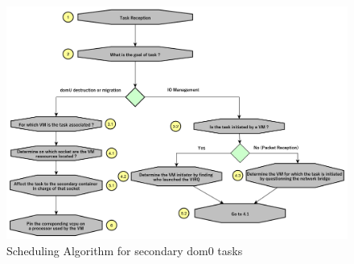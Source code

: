 \begin{figure}[!h]
    \centering
    \includegraphics[scale=0.35]{fig04/algoSecondGroupSchedulingDom0.pdf}
    \caption{Scheduling Algorithm for secondary dom0 tasks}
    \label{fig:algo}
\end{figure}
\vspace{-1cm}
